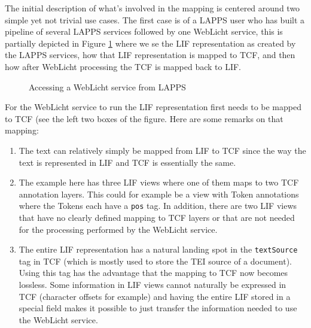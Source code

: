 \documentclass[11pt]{article}
\newcommand{\tag}[1]{{\tt #1}}
\begin{document}
The initial description of what's involved in the mapping is centered around two simple yet not trivial use cases. The first case is of a LAPPS user who has built a pipeline of several LAPPS services followed by one WebLicht service, this is partially depicted in Figure \ref{fig:lif2tcf2lif} where we se the LIF representation as created by the LAPPS services, how that LIF representation is mapped to TCF, and then how after WebLicht processing the TCF is mapped back to LIF.

\begin{figure}[ht]
  \begin{center}
    \caption{Accessing a WebLicht service from LAPPS}
    \label{fig:lif2tcf2lif}
  \end{center}
\end{figure}

For the WebLicht service to run the LIF representation first needs to be mapped to TCF (see the left two boxes of the figure. Here are some remarks on that mapping:

\begin{enumerate}

\item The text can relatively simply be mapped from LIF to TCF since the way the text is represented in LIF and TCF is essentially the same.

\item The example here has three LIF views where one of them maps to two TCF annotation layers. This could for example be a view with Token annotations where the Tokens each have a \tag{pos} tag. In addition, there are two LIF views that have no clearly defined mapping to TCF layers or that are not needed for the processing performed by the WebLicht service.

\item The entire LIF representation has a natural landing spot in the \tag{textSource} tag in TCF (which is mostly used to store the TEI source of a document). Using this tag has the advantage that the mapping to TCF now becomes lossless. Some information in LIF views cannot naturally be expressed in TCF (character offsets for example) and having the entire LIF stored in a special field makes it possible to just transfer the information needed to use the WebLicht service.

\end{enumerate}
\end{document}
